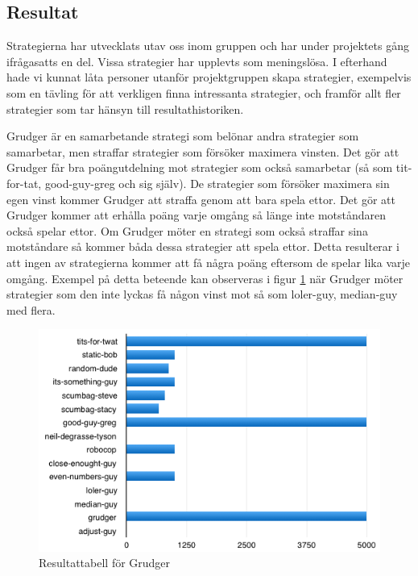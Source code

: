 \subsection{Resultat}
Strategierna har utvecklats utav oss inom gruppen och har under projektets gång ifrågasatts en del. Vissa strategier har upplevts som meningslösa. I efterhand hade vi kunnat låta personer utanför projektgruppen skapa strategier, exempelvis som en tävling för att verkligen finna intressanta strategier, och framför allt fler strategier som tar hänsyn till resultathistoriken.

Grudger är en samarbetande strategi som belönar andra strategier som samarbetar, men straffar strategier som försöker maximera vinsten. Det gör att Grudger får bra poängutdelning mot strategier som också samarbetar (så som tit-for-tat, good-guy-greg och sig själv). De strategier som försöker maximera sin egen vinst kommer Grudger att straffa genom att bara spela ettor. Det gör att Grudger kommer att erhålla poäng varje omgång så länge inte motståndaren också spelar ettor. Om Grudger möter en strategi som också straffar sina motståndare så kommer båda dessa strategier att spela ettor. Detta resulterar i att ingen av strategierna kommer att få några poäng eftersom de spelar lika varje omgång. Exempel på detta beteende kan observeras i figur \ref{grudger} när Grudger möter strategier som den inte lyckas få någon vinst mot så som loler-guy, median-guy med flera. 

\begin{figure}[H]
	\begin{center}
	\includegraphics[scale=0.75, angle=0]{bilder/grudger.png}
	\caption{Resultattabell för Grudger}
	\label{grudger}
	\end{center}
\end{figure}

